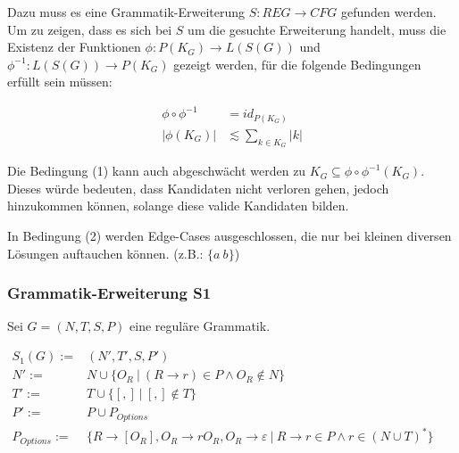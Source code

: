 \documentclass[]{article}
\begin{document}
Dazu muss es eine Grammatik-Erweiterung $S: REG\rightarrow CFG$ gefunden werden.
Um zu zeigen, dass es sich bei $S$ um die gesuchte Erweiterung handelt, muss die Existenz der Funktionen $\phi: P(K_G) \rightarrow L(S(G))$ und $\phi^{-1}: L(S(G)) \rightarrow P(K_G)$ gezeigt werden, für die folgende Bedingungen erfüllt sein müssen:

\begin{align}
  \phi\circ\phi^{-1} &= id_{P(K_G)} \\
  |\phi(K_G)| &\lesssim \sum_{k\in K_G} |k|
\end{align}


Die Bedingung (1) kann auch abgeschwächt werden zu $K_G\subseteq \phi\circ\phi^{-1}(K_G)$. Dieses würde bedeuten, dass Kandidaten nicht verloren gehen, jedoch hinzukommen können, solange diese valide Kandidaten bilden.

In Bedingung (2) werden Edge-Cases ausgeschlossen, die nur bei kleinen diversen Lösungen auftauchen können. (z.B.: $\{a\ b\}$)


% 
%     

\subsubsection*{Grammatik-Erweiterung S1}

Sei $G = (N,T,S,P)$ eine reguläre Grammatik.


$
\begin{array}{rl}
  S_1(G) :=& (N', T', S, P') \\
  N' :=& N \cup \{ O_R\ |\ (R\rightarrow r)\in P\land O_R \notin N\}\\
  T' :=& T \cup \{[ , ]\ |\ [,]\notin T \}\\
  P' :=& P
  \cup P_{Options} 
  \\
  P_{Options} :=& \{R \rightarrow [O_R], O_R \rightarrow r O_R, O_R \rightarrow \varepsilon \ \vert\ R\rightarrow r\in P
  \land r\in (N\cup T)^*\} \\
\end{array}
$
\end{document}
